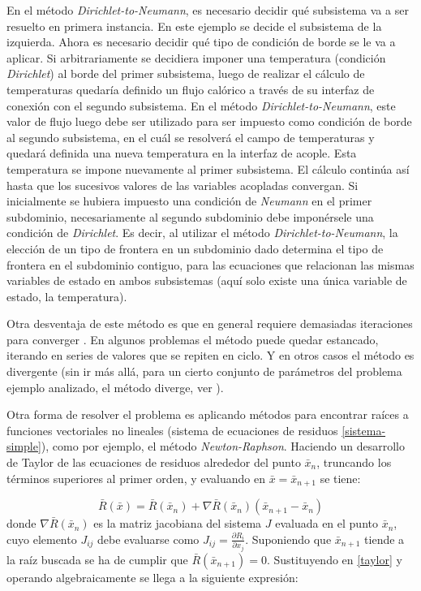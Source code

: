 En el método \textit{Dirichlet-to-Neumann}, es necesario decidir qué subsistema va a ser resuelto en primera instancia.
En este ejemplo se decide el subsistema de la izquierda.
Ahora es necesario decidir qué tipo de condición de borde se le va a aplicar.
Si arbitrariamente se decidiera imponer una temperatura (condición \textit{Dirichlet}) al borde del primer subsistema,
luego de realizar el cálculo de temperaturas quedaría definido un flujo calórico a través de su interfaz de conexión con el segundo subsistema.
En el método \textit{Dirichlet-to-Neumann}, este valor de flujo luego debe ser utilizado para ser impuesto como condición de borde al segundo subsistema,
en el cuál se resolverá el campo de temperaturas y quedará definida una nueva temperatura en la interfaz de acople.
Esta temperatura se impone nuevamente al primer subsistema.
El cálculo continúa así hasta que los sucesivos valores de las variables acopladas convergan.
Si inicialmente se hubiera impuesto una condición de \textit{Neumann} en el primer subdominio, necesariamente al segundo subdominio debe imponérsele una condición de \textit{Dirichlet}. Es decir, al utilizar el método \textit{Dirichlet-to-Neumann}, la elección de un tipo de frontera en un subdominio dado determina el tipo de frontera en el subdominio contiguo,
para las ecuaciones que relacionan las mismas variables de estado en ambos subsistemas (aquí solo existe una única variable de estado, la temperatura).

Otra desventaja de este método es que en general requiere demasiadas iteraciones para converger \cite{fede-enief2016}. En algunos problemas el método puede quedar estancado, iterando en series de valores que se repiten en ciclo. Y en otros casos el método es divergente (sin ir más allá, para un cierto conjunto de parámetros del problema ejemplo analizado, el método diverge, ver \cite{coup-strong}).

Otra forma de resolver el problema es aplicando métodos para encontrar raíces a funciones vectoriales no lineales (sistema de ecuaciones de residuos \ref{sistema-simple}),
como por ejemplo, el método \textit{Newton-Raphson}.
Haciendo un desarrollo de Taylor de las ecuaciones de residuos alrededor del punto $\bar{x}_n$, truncando los términos superiores al primer orden, y evaluando en $\bar{x}=\bar{x}_{n+1}$ se tiene:

\begin{equation}
\bar{R}(\bar{x}) = \bar{R}(\bar{x}_n) + \nabla \bar{R}(\bar{x}_n)(\bar{x}_{n+1}-\bar{x}_n)
\label{taylor}
\end{equation}
donde $\nabla \bar{R}(\bar{x}_n)$ es la matriz jacobiana del sistema $J$ evaluada en el punto $\bar{x}_n$, cuyo elemento $J_{ij}$ debe evaluarse como $J_{ij}=\frac{\partial R_i}{\partial x_j}$.
Suponiendo que ${\bar{x}_{n+1}}$ tiende a la raíz buscada se ha de cumplir que $\bar{R}(\bar{x}_{n+1})=0$. Sustituyendo en \ref{taylor} y operando algebraicamente se llega a la siguiente expresión:

